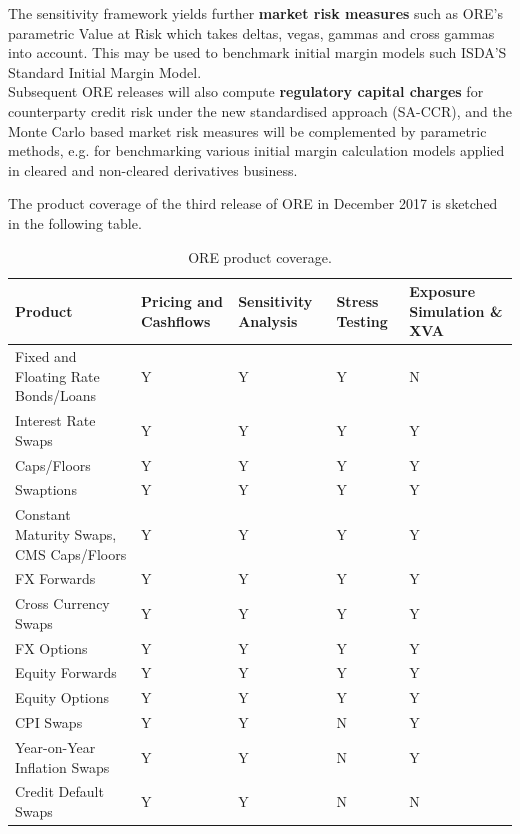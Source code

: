 \documentclass[12pt, a4paper]{article}
\begin{document}
\medskip
The sensitivity framework yields further {\bf market risk measures} such as ORE's parametric Value at Risk which takes deltas, vegas, gammas and cross gammas into account. This may be used to benchmark initial margin models such ISDA'S Standard Initial Margin Model. \\

\medskip
Subsequent ORE releases will also compute {\bf regulatory capital charges} for counterparty credit risk under the new standardised approach (SA-CCR), and the Monte Carlo based market risk measures will be complemented by parametric methods, e.g. for benchmarking various initial margin calculation models applied in cleared and non-cleared derivatives business.

\medskip 
The product coverage of the third release of ORE in December 2017 is sketched in the following table.
\begin{table}[hbt]
\scriptsize
\begin{center}
\begin{tabular}{|l|p{1.5cm}|p{1.5cm}|p{1.2cm}|p{1.5cm}|}
\hline
Product & Pricing and Cashflows & Sensitivity Analysis & Stress Testing & Exposure Simulation \& XVA\\
\hline
Fixed and Floating Rate Bonds/Loans & Y & Y & Y & N \\
\hline
Interest Rate Swaps & Y & Y & Y & Y\\
\hline
Caps/Floors & Y & Y & Y & Y\\
\hline
Swaptions & Y & Y & Y &Y \\
\hline
Constant Maturity Swaps, CMS Caps/Floors & Y & Y & Y & Y\\
\hline
FX Forwards & Y & Y & Y & Y \\
\hline
Cross Currency Swaps & Y & Y & Y & Y \\
\hline
FX Options & Y & Y & Y & Y\\
\hline
Equity Forwards & Y & Y & Y & Y\\
\hline
Equity Options & Y & Y & Y & Y \\
\hline
CPI Swaps & Y & Y & N & Y \\
\hline
Year-on-Year Inflation Swaps & Y & Y & N & Y \\
\hline
Credit Default Swaps & Y & Y & N & N \\
\hline
\end{tabular}
\caption{ORE product coverage.}
\label{tab_coverage}
\end{center}
\end{table}
\end{document}
